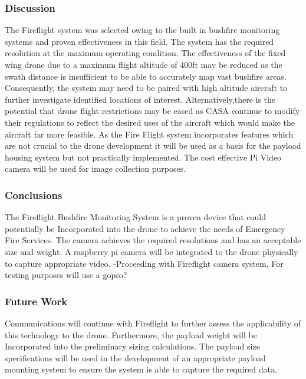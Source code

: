 \subsubsection{Discussion}
The Fireflight system was selected owing to the built in bushfire monitoring systems and proven effectiveness in this field. The system has the required resolution at the maximum operating condition. The effectiveness of the fixed wing drone due to a maximum flight altitude of 400ft may be reduced as the swath distance is insufficient to be able to accurately map vast bushfire areas. Consequently, the system may need to be paired with high altitude aircraft to further investigate identified locations of interest. Alternatively,there is the potential that drone flight restrictions may be eased as CASA continue to modify their regulations to reflect the desired uses of the aircraft which would make the aircraft far more feasible. As the Fire Flight system incorporates features which are not crucial to the drone development it will be used as a basis for the payload housing system but not practically implemented. The cost effective Pi Video camera will be used for image collection purposes.

\subsubsection{Conclusions}
The Fireflight Bushfire Monitoring System is a proven device that could potentially be Incorporated into the drone to achieve the needs of Emergency Fire Services. The camera achieves the required resolutions and has an acceptable size and weight. A raspberry pi camera will be integrated to the drone physically to capture appropriate video.  
-Proceeding with Fireflight camera system,
For testing purposes will use a gopro?
\subsubsection{Future Work}
Communications will continue with Fireflight to further assess the applicability of this technology to the drone. Furthermore, the payload weight will be Incorporated into the preliminary sizing calculations. The payload size specifications will be used in the development of an appropriate payload mounting system to ensure the system is able to capture the required data. 


